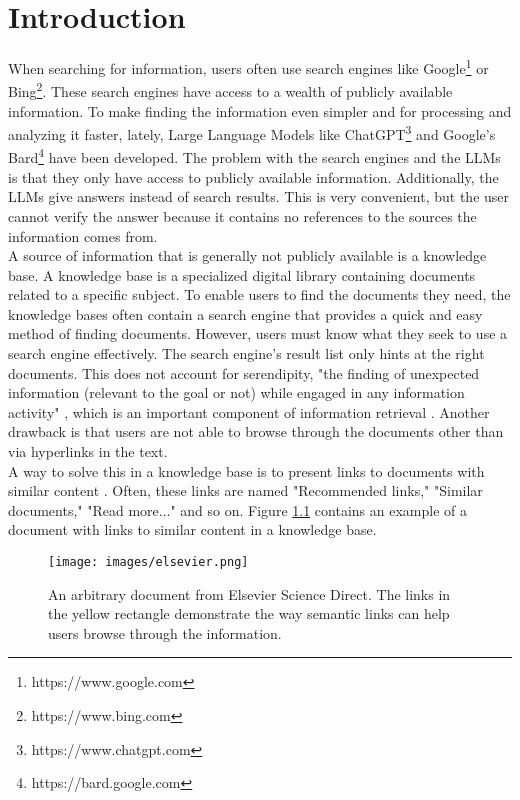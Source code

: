 \chapter{Introduction}

When searching for information, users often use search engines like Google\footnote{https://www.google.com} or Bing\footnote{https://www.bing.com}. These search engines have access to a wealth of publicly available information. To make finding the information even simpler and for processing and analyzing it faster, lately, Large Language Models like ChatGPT\footnote{https://www.chatgpt.com} and Google's Bard\footnote{https://bard.google.com} have been developed. The problem with the search engines and the LLMs is that they only have access to publicly available information. Additionally, the LLMs give answers instead of search results. This is very convenient, but the user cannot verify the answer because it contains no references to the sources the information comes from.\\

A source of information that is generally not publicly available is a knowledge base. A knowledge base is a specialized digital library containing documents related to a specific subject. To enable users to find the documents they need, the knowledge bases often contain a search engine that provides a quick and easy method of finding documents. However, users must know what they seek to use a search engine effectively. The search engine's result list only hints at the right documents. This does not account for serendipity, "the finding of unexpected information (relevant to the goal or not) while engaged in any information activity" \citep{andre2009discovery}, which is an important component of information retrieval \citep{foster2003serendipity}. Another drawback is that users are not able to browse through the documents other than via hyperlinks in the text.\\

A way to solve this in a knowledge base is to present links to documents with similar content \citep{makri2014making}. Often, these links are named "Recommended links," "Similar documents," "Read more..." and so on. Figure \ref{imgelsevier} contains an example of a document with links to similar content in a knowledge base. \\


\begin{figure}[h]
\centering
\captionsetup{justification=centering}
\texttt{[image: images/elsevier.png]}
\caption{An arbitrary document from Elsevier Science Direct. The links in the yellow rectangle demonstrate the way semantic links can help users browse through the information.}
\label{imgelsevier}
\end{figure}

